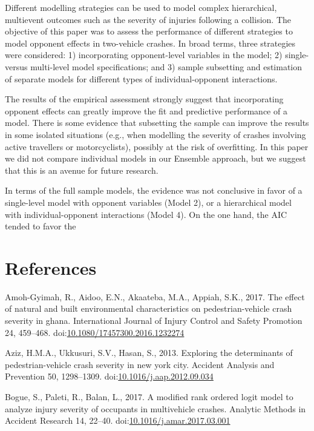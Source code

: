 \documentclass[]{elsarticle} %
\begin{document}
Different modelling strategies can be used to model complex
hierarchical, multievent outcomes such as the severity of injuries
following a collision. The objective of this paper was to assess the
performance of different strategies to model opponent effects in
two-vehicle crashes. In broad terms, three strategies were considered:
1) incorporating opponent-level variables in the model; 2) single-
versus multi-level model specifications; and 3) sample subsetting and
estimation of separate models for different types of individual-opponent
interactions.

The results of the empirical assessment strongly suggest that
incorporating opponent effects can greatly improve the fit and
predictive performance of a model. There is some evidence that
subsetting the sample can improve the results in some isolated
situations (e.g., when modelling the severity of crashes involving
active travellers or motorcyclists), possibly at the risk of
overfitting. In this paper we did not compare individual models in our
Ensemble approach, but we suggest that this is an avenue for future
research.

In terms of the full sample models, the evidence was not conclusive in
favor of a single-level model with opponent variables (Model 2), or a
hierarchical model with individual-opponent interactions (Model 4). On
the one hand, the AIC tended to favor the

\hypertarget{references}{%
\section*{References}\label{references}}

\hypertarget{refs}{}
\leavevmode\hypertarget{ref-Amoh2017effect}{}%
Amoh-Gyimah, R., Aidoo, E.N., Akaateba, M.A., Appiah, S.K., 2017. The
effect of natural and built environmental characteristics on
pedestrian-vehicle crash severity in ghana. International Journal of
Injury Control and Safety Promotion 24, 459--468.
doi:\href{https://doi.org/10.1080/17457300.2016.1232274}{10.1080/17457300.2016.1232274}

\leavevmode\hypertarget{ref-Aziz2013exploring}{}%
Aziz, H.M.A., Ukkusuri, S.V., Hasan, S., 2013. Exploring the
determinants of pedestrian-vehicle crash severity in new york city.
Accident Analysis and Prevention 50, 1298--1309.
doi:\href{https://doi.org/10.1016/j.aap.2012.09.034}{10.1016/j.aap.2012.09.034}

\leavevmode\hypertarget{ref-Bogue2017modified}{}%
Bogue, S., Paleti, R., Balan, L., 2017. A modified rank ordered logit
model to analyze injury severity of occupants in multivehicle crashes.
Analytic Methods in Accident Research 14, 22--40.
doi:\href{https://doi.org/10.1016/j.amar.2017.03.001}{10.1016/j.amar.2017.03.001}
\end{document}
